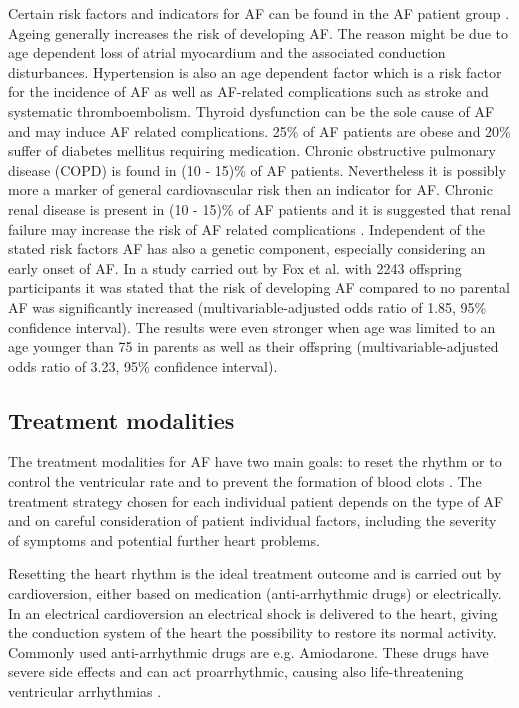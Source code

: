 Certain risk factors and indicators for AF can be found in the AF patient group \cite{CE09}. Ageing generally increases the risk of 
developing AF. The reason might be due to age dependent loss of atrial myocardium and the associated conduction disturbances. Hypertension 
is also an age dependent factor which is a risk factor for the incidence of AF as well as AF-related complications such as stroke and 
systematic thromboembolism. Thyroid dysfunction
can be the sole cause of AF and may induce AF related complications. 25\% of AF patients are obese \cite{Nab09} and 20\% suffer of 
diabetes mellitus requiring medication. Chronic obstructive pulmonary 
disease (COPD) is found in (10 - 15)\% of AF patients. Nevertheless it is possibly more a marker of general cardiovascular risk then an 
indicator for AF. Chronic renal disease is present in (10 - 15)\% of AF patients and it is suggested that renal failure may increase the 
risk of AF related complications \cite{CE09}. Independent of the stated risk factors AF has also a genetic component, especially 
considering an early onset of AF. In a study carried out by Fox et al. \cite{Fox09} with 2243 offspring participants it was stated that the 
risk of developing AF compared to no parental AF was significantly increased (multivariable-adjusted odds ratio of 1.85, 95\% confidence 
interval). The results were even stronger when age was limited to an age younger than 75 in parents as well as their offspring 
(multivariable-adjusted odds ratio of 3.23, 95\% confidence interval). 


\subsection{Treatment modalities}

The treatment modalities for AF have two main goals: to reset the rhythm or to control the ventricular rate and to prevent the formation of blood 
clots \cite{Mayo, CE09}. The treatment strategy chosen for each individual patient depends on the type of AF and on careful 
consideration of patient individual factors, including the severity of symptoms and potential further heart problems. \newline

Resetting the heart rhythm is the ideal treatment outcome and is carried out by cardioversion, either based on medication (anti-arrhythmic 
drugs) or electrically. In an electrical cardioversion an electrical shock is delivered to the heart, giving the conduction system of the 
heart the possibility to restore its normal activity. Commonly used anti-arrhythmic drugs are e.g. Amiodarone. These drugs have severe side 
effects and can act proarrhythmic, causing also life-threatening ventricular arrhythmias \cite{Mayo}.\newline


